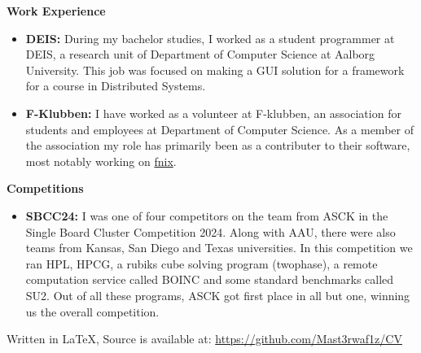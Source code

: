 \documentclass[a4paper, 14pt]{article}
\newcommand{\myitem}[1]{\item[\color{myorange}$\circ$]#1}
\newcommand{\newcvsection}[2]{
    \noindent\huge \textbf{#1} \color{myorange}\hrulefill\color{black}
    
    \normalsize
    #2    
    \vspace{.5cm}
}
\begin{document}
    \newcvsection{Work Experience}{
        \begin{itemize}
            \myitem{
                \textbf{DEIS: } During my bachelor studies, I worked as a student programmer at DEIS, a research unit of Department of Computer Science at Aalborg University. 
                This job was focused on making a GUI solution for a framework for a course in Distributed Systems.
            }
                
            \myitem{
                \textbf{F-Klubben: } I have worked as a volunteer at F-klubben, an association for students and employees at Department of Computer Science. 
                As a member of the association my role has primarily been as a contributer to their software, most notably working on \href{https://github.com/f-klubben/fnix}{fnix}.
            }
        \end{itemize}
    }

    \newcvsection{Competitions}{
        \begin{itemize}
            \myitem{
                \textbf{SBCC24: } I was one of four competitors on the team from ASCK in the Single Board Cluster Competition 2024.
                Along with AAU, there were also teams from Kansas, San Diego and Texas universities.
                In this competition we ran HPL, HPCG, a rubiks cube solving program (twophase), a remote computation service called BOINC and some standard benchmarks called SU2.
                Out of all these programs, ASCK got first place in all but one, winning us the overall competition.
            }
        \end{itemize}
    }

    \vspace*{\fill}
    \tiny Written in \LaTeX, Source is available at: \href{https://github.com/Mast3rwaf1z/CV}{https://github.com/Mast3rwaf1z/CV}
\end{document}
